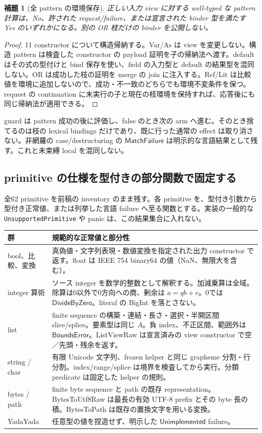 \documentclass[11pt,a4paper]{article}
\newtheorem{lemma}[theorem]{補題}
\theoremstyle{remark}
\begin{document}
\begin{lemma}[全 pattern の環境保存]
正しい入力 view に対する well-typed な pattern 計算は、No、許された request/failure、または宣言された binder 型を満たす Yes のいずれかになる。別の OR 枝だけの binder を公開しない。
\end{lemma}
\begin{proof}
11 constructor について構造帰納する。Var/As は view を変更しない。構造 pattern は検査した constructor の payload 証明を子の帰納法へ渡す。default はその式の型付けと bind 保存を使い、field の入力型と default の結果型を混同しない。OR は成功した枝の証明を merge の join に注入する。Ref/Lit は比較値を環境に追加しないので、成功・不一致のどちらでも環境不変条件を保つ。request の continuation に未実行の子と現在の枝環境を保持すれば、応答後にも同じ帰納法が適用できる。
\end{proof}

guard は pattern 成功の後に評価し、false のとき次の arm へ進む。そのとき捨てるのは枝の lexical bindings だけであり、既に行った通常の effect は取り消さない。非網羅の case/destructuring の \(\mathsf{MatchFailure}\) は明示的な言語結果として残す。これと未束縛 local を混同しない。

\subsection{primitive の仕様を型付きの部分関数で固定する}

全62 primitive を前稿の inventory のまま残す。各 primitive を、型付き引数から型付き正常値、または列挙した言語 failure へ至る関数とする。実装の一般的な \texttt{UnsupportedPrimitive} や panic は、この結果集合に入れない。

\begin{longtable}{p{}p{}}
\toprule
群 & 規範的な正常値と部分性 \\
\midrule\endhead
bool、比較、変換 & 真偽値・文字列表現・数値変換を指定された出力 constructor で返す。float は IEEE 754 binary64 の値（NaN、無限大を含む）。\\
integer 算術 & ソース integer を数学的整数として解釈する。加減乗算は全域。除算は0以外で0方向への商、剰余は \(a=q b+r\)。0では \(\mathsf{DivideByZero}\)。literal の BigInt を落とさない。\\
list & finite sequence の構築・連結・長さ・選択・半開区間 slice/splice。要素型は同じ \(A\)。負 index、不正区間、範囲外は \(\mathsf{BoundsError}\)。ListViewRaw は宣言済みの view constructor で空／先頭・残余を返す。\\
string / char & 有限 Unicode 文字列、frozen helper と同じ grapheme 分割・行分割。index/range/splice は境界を検査してから実行。分類 predicate は固定した helper の規則。\\
bytes / path & finite byte sequence と path の既存 representation。BytesToUtf8Raw は最長の有効 UTF-8 prefix とその byte 長の積。BytesToPath は既存の置換文字を用いる変換。\\
YadaYada & 任意型の値を捏造せず、明示した \(\mathsf{Unimplemented}\) failure。\\
\bottomrule
\end{longtable}
\end{document}
